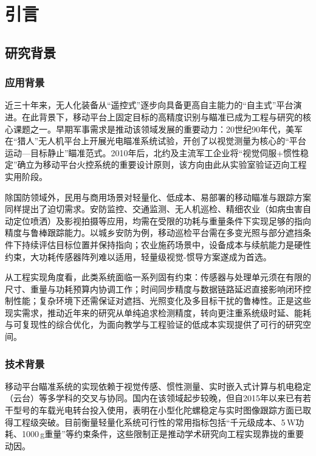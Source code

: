 \chapter{引言}

\section{研究背景}

\subsection{应用背景}
近三十年来，无人化装备从``遥控式''逐步向具备更高自主能力的``自主式''平台演进。在此背景下，移动平台上固定目标的高精度识别与瞄准已成为工程与研究的核心课题之一。早期军事需求是推动该领域发展的重要动力：20世纪90年代，美军在``猎人''无人机平台上开展光电瞄准系统试验，开创了以视觉测量为核心的``平台运动—目标静止''瞄准范式。2010年后，北约及主流军工企业将``视觉伺服+惯性稳定''确立为移动平台火控系统的重要设计原则，该方向由此从实验室验证迈向工程实用阶段\cite{Hutchinson1996visualservo,Ma2017VisualServo}。

除国防领域外，民用与商用场景对轻量化、低成本、易部署的移动瞄准与跟踪方案同样提出了迫切需求。安防监控、交通监测、无人机巡检、精细农业（如病虫害自动定位喷洒）及影视拍摄等应用，均需在受限的功耗与重量条件下实现足够的指向精度与鲁棒跟踪能力。以城乡安防为例，移动巡检平台需在多变光照与部分遮挡条件下持续评估目标位置并保持指向；农业施药场景中，设备成本与续航能力是硬性约束，大功耗传感器阵列难以适用，轻量级视觉-惯导方案遂成为首选。

从工程实现角度看，此类系统面临一系列固有约束：传感器与处理单元须在有限的尺寸、重量与功耗预算内协调工作；时间同步精度与数据链路延迟直接影响闭环控制性能；复杂环境下还需保证对遮挡、光照变化及多目标干扰的鲁棒性。正是这些现实需求，推动近年来的研究从单纯追求检测精度，转向更注重系统级时延、能耗与可复现性的综合优化，为面向教学与工程验证的低成本实现提供了可行的研究空间。
\subsection{技术背景}
移动平台瞄准系统的实现依赖于视觉传感、惯性测量、实时嵌入式计算与机电稳定（云台）等多学科的交叉与协同。国内在该领域起步较晚，但自2015年以来已有若干型号的车载光电转台投入使用，表明在小型化陀螺稳定与实时图像跟踪方面已取得工程级突破。目前衡量轻量化系统可行性的常用指标包括``千元级成本、5\,W功耗、1000\,g重量''等约束条件，这些限制正是推动学术研究向工程实现靠拢的重要动因。

